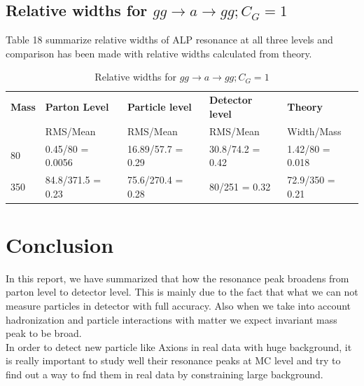 \documentclass[12pt,a4paper]{article}
\begin{document}
\subsection{Relative widths for $g g\rightarrow a \rightarrow g g; C_G = 1$}
Table 18 summarize relative widths of ALP resonance at all three levels and comparison has been made with relative widths calculated from theory.

\begin{table}[h!]
\begin{center}
\label{tab : table18}
\begin{tabular}{l|l|l|l|l}
\hline
\textbf{Mass} & \textbf{Parton Level} & \textbf{Particle level} & \textbf{Detector level} & \textbf{Theory}\\
 & RMS/Mean & RMS/Mean & RMS/Mean & Width/Mass \\
\hline
80 & 0.45/80 = 0.0056 & 16.89/57.7 = 0.29 & 30.8/74.2 = 0.42 & 1.42/80 = 0.018\\
\hline
350 & 84.8/371.5 = 0.23 & 75.6/270.4 = 0.28 & 80/251 = 0.32 & 72.9/350 = 0.21 \\
\hline
\end{tabular}
\caption{Relative widths for $g g\rightarrow a \rightarrow g g; C_G = 1$  }
\end{center}
\end{table}

\pagebreak


\section{Conclusion}
In this report, we have summarized that how the resonance peak broadens from parton level to detector level. This is mainly due to the fact that what we can not measure particles in detector with full accuracy. Also when we take into account hadronization and particle interactions with matter we expect invariant mass peak to be broad. \\
In order to detect new particle like Axions in real data with huge background, it is really important to study well their resonance peaks at MC level and try to find out a way to fnd them in real data by constraining large background.

 
\end{document}
